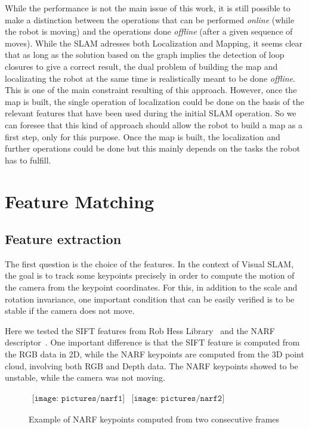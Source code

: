 While the performance is not the main issue of this work, it is still possible to make a distinction between the operations that can be performed \emph{online} (while the robot is moving) and the operations done \emph{offline} (after a given sequence of moves). While the SLAM adresses both Localization and Mapping, it seems clear that as long as the solution based on the graph implies the detection of loop closures to give a correct result, the dual problem of building the map and localizating the robot at the same time is realistically meant to be done \emph{offline}. This is one of the main constraint resulting of this approach. However, once the map is built, the single operation of localization could be done on the basis of the relevant features that have been used during the initial SLAM operation. So we can foresee that this kind of approach should allow the robot to build a map as a first step, only for this purpose. Once the map is built, the localization and further operations could be done but this mainly depends on the tasks the robot has to fulfill.

\chapter{Feature Matching}
\label{chap:features}

\section{Feature extraction}

The first question is the choice of the features. In the context of Visual SLAM, the goal is to track some keypoints precisely in order to compute the motion of the camera from the keypoint coordinates. For this, in addition to the scale and rotation invariance, one important condition that can be easily verified is to be stable if the camera does not move. 

Here we tested the SIFT features from Rob Hess Library~\cite{hess_sift} and the NARF descriptor~\cite{steder10irosws}. One important difference is that the SIFT feature is computed from the RGB data in 2D, while the NARF keypoints are computed from the 3D point cloud, involving both RGB and Depth data.
The NARF keypoints showed to be unstable, while the camera was not moving.

\begin{figure}[h!]
\centering$
\begin{array}{cc}
\texttt{[image: pictures/narf1]} &
\texttt{[image: pictures/narf2]}
\end{array}$
\caption{Example of NARF keypoints computed from two consecutive frames}
\end{figure}

